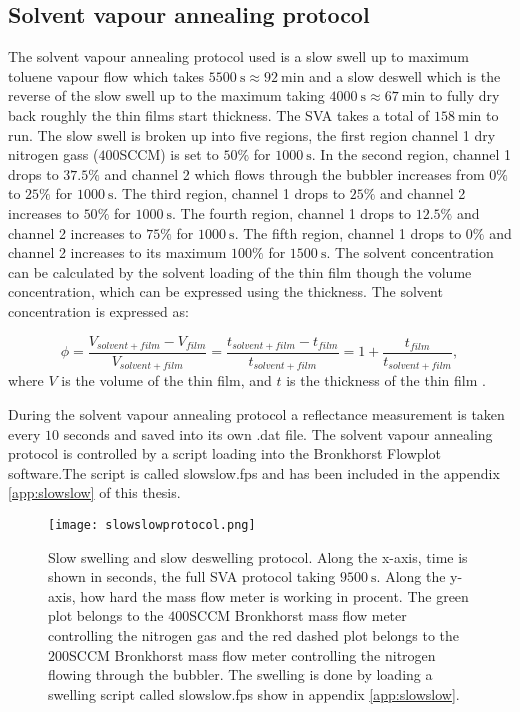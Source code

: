 \documentclass[MasterThesisMain.tex]{subfiles}
\begin{document}
\subsection{Solvent vapour annealing protocol} \label{sec:svaprotocol}
The solvent vapour annealing protocol used is a slow swell up to maximum toluene vapour flow which takes $\SI{5500}{\second}\approx\SI{92}{\minute}$ and a slow deswell which is the reverse of the slow swell up to the maximum taking $\SI{4000}{\second}\approx\SI{67}{\minute}$ to fully dry back roughly the thin films start thickness. The SVA takes a total of $\SI{158}{\minute}$ to run. The slow swell is broken up into five regions, the first region channel 1 dry nitrogen gass ($400$SCCM) is set to $50 \%$ for $\SI{1000}{\second}$. In the second region, channel 1 drops to $37.5 \%$ and channel 2 which flows through the bubbler increases from $0 \%$ to $25 \%$ for $\SI{1000}{\second}$. The third region, channel 1 drops to $25 \%$ and channel 2 increases to $50 \%$ for $\SI{1000}{\second}$. The fourth region, channel 1 drops to $12.5 \%$ and channel 2 increases to $75 \%$ for $\SI{1000}{\second}$. The fifth region, channel 1 drops to $0 \%$ and channel 2 increases to its maximum $100 \%$ for $\SI{1500}{\second}$. The solvent concentration can be calculated by the solvent loading of the thin film though the volume concentration, which can be expressed using the thickness. The solvent concentration is expressed as:

\begin{equation}
\phi= \frac{V_{solvent+film}-V_{film}}{V_{solvent+film}} = \frac{t_{solvent+film}-t_{film}}{t_{solvent+film}} = 1+\frac{t_{film}}{t_{solvent+film}}, 
\end{equation}
where $V$ is the volume of the thin film, and $t$ is the thickness of the thin film \cite{solventconcentration}.

During the solvent vapour annealing protocol a reflectance measurement is taken every $10$ seconds and saved into its own .dat file. The solvent vapour annealing protocol is controlled by a script loading into the Bronkhorst Flowplot software.The script is called slowslow.fps and has been included in the appendix \ref{app:slowslow} of this thesis.

\begin{figure}
\centering
\texttt{[image: slowslowprotocol.png]}
\caption{Slow swelling and slow deswelling protocol. Along the x-axis, time is shown in seconds, the full SVA protocol taking $\SI{9500}{\second}$. Along the y-axis, how hard the mass flow meter is working in procent. The green plot belongs to the $400$SCCM Bronkhorst mass flow meter controlling the nitrogen gas and the red dashed plot belongs to the $200$SCCM Bronkhorst mass flow meter controlling the nitrogen flowing through the bubbler. The swelling is done by loading a swelling script called slowslow.fps show in appendix \ref{app:slowslow}.}
\label{fig:slowslow}
\end{figure}
   
\end{document}
